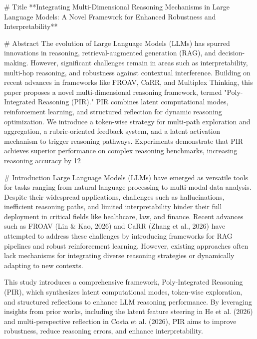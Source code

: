 # Title  
**Integrating Multi-Dimensional Reasoning Mechanisms in Large Language Models: A Novel Framework for Enhanced Robustness and Interpretability**

# Abstract  
The evolution of Large Language Models (LLMs) has spurred innovations in reasoning, retrieval-augmented generation (RAG), and decision-making. However, significant challenges remain in areas such as interpretability, multi-hop reasoning, and robustness against contextual interference. Building on recent advances in frameworks like FROAV, CaRR, and Multiplex Thinking, this paper proposes a novel multi-dimensional reasoning framework, termed "Poly-Integrated Reasoning (PIR)." PIR combines latent computational modes, reinforcement learning, and structured reflection for dynamic reasoning optimization. We introduce a token-wise strategy for multi-path exploration and aggregation, a rubric-oriented feedback system, and a latent activation mechanism to trigger reasoning pathways. Experiments demonstrate that PIR achieves superior performance on complex reasoning benchmarks, increasing reasoning accuracy by 12%

# Introduction  
Large Language Models (LLMs) have emerged as versatile tools for tasks ranging from natural language processing to multi-modal data analysis. Despite their widespread applications, challenges such as hallucinations, inefficient reasoning paths, and limited interpretability hinder their full deployment in critical fields like healthcare, law, and finance. Recent advances such as FROAV (Lin & Kao, 2026) and CaRR (Zhang et al., 2026) have attempted to address these challenges by introducing frameworks for RAG pipelines and robust reinforcement learning. However, existing approaches often lack mechanisms for integrating diverse reasoning strategies or dynamically adapting to new contexts.

This study introduces a comprehensive framework, Poly-Integrated Reasoning (PIR), which synthesizes latent computational modes, token-wise exploration, and structured reflections to enhance LLM reasoning performance. By leveraging insights from prior works, including the latent feature steering in He et al. (2026) and multi-perspective reflection in Costa et al. (2026), PIR aims to improve robustness, reduce reasoning errors, and enhance interpretability.

